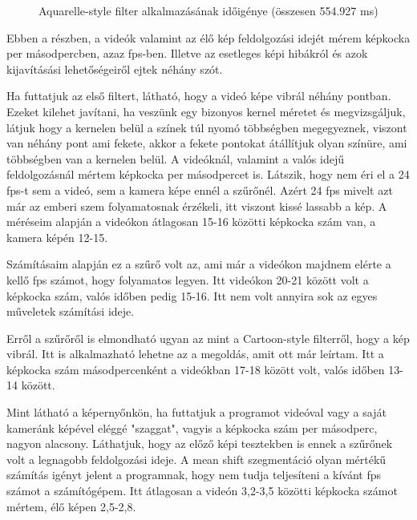\begin{figure}[h!]
\centering
{}
\caption{Aquarelle-style filter alkalmazásának időigénye (összesen 554.927 ms)}
\label{fig:pie4}
\end{figure}


Ebben a részben, a videók valamint az élő kép feldolgozási idejét mérem képkocka per másodpercben, azaz fps-ben. Illetve az esetleges képi hibákról és azok kijavításási lehetőségeiről ejtek néhány szót.


Ha futtatjuk az első filtert, látható, hogy a videó képe vibrál néhány pontban. Ezeket kilehet javítani, ha veszünk egy bizonyos kernel méretet és megvizsgáljuk, látjuk hogy a kernelen belül a színek túl nyomó többségben megegyeznek, viszont van néhány pont ami fekete, akkor a fekete pontokat átállítjuk olyan színüre, ami többségben van a kernelen belül. A videóknál, valamint a valós idejű feldolgozásnál mértem képkocka per másodpercet is. Látszik, hogy nem éri el a 24 fps-t sem a videó, sem a kamera képe ennél a szűrőnél. Azért 24 fps mivelt azt már az emberi szem folyamatosnak érzékeli, itt viszont kissé lassabb a kép. A méréseim alapján a videókon átlagosan 15-16 közötti képkocka szám van, a kamera képén 12-15.


Számításaim alapján ez a szűrő volt az, ami már a videókon majdnem elérte a kellő fps számot, hogy folyamatos legyen. Itt videókon 20-21 között volt a képkocka szám, valós időben pedig 15-16. Itt nem volt annyira sok az egyes műveletek számítási ideje.


Erről a szűrőről is elmondható ugyan az mint a Cartoon-style filterről, hogy a kép vibrál. Itt is alkalmazható lehetne az a megoldás, amit ott már leírtam. Itt a képkocka szám másodpercenként a videókban 17-18 között volt, valós időben 13-14 között.


Mint látható a képernyőnkön, ha futtatjuk a programot videóval vagy a saját kameránk képével eléggé "szaggat", vagyis a képkocka szám per másodperc, nagyon alacsony. Láthatjuk, hogy az előző képi tesztekben is ennek a szűrőnek volt a legnagobb feldolgozási ideje. A mean shift szegmentáció olyan mértékű számítás igényt jelent a programnak, hogy nem tudja teljesíteni a kívánt fps számot a számítógépem. Itt átlagosan a videón 3,2-3,5 közötti képkocka számot mértem, élő képen 2,5-2,8.


